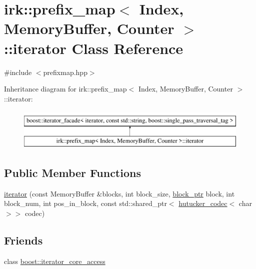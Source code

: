 \hypertarget{classirk_1_1prefix__map_1_1iterator}{}\section{irk\+:\+:prefix\+\_\+map$<$ Index, Memory\+Buffer, Counter $>$\+:\+:iterator Class Reference}
\label{classirk_1_1prefix__map_1_1iterator}


{\ttfamily \#include $<$prefixmap.\+hpp$>$}

Inheritance diagram for irk\+:\+:prefix\+\_\+map$<$ Index, Memory\+Buffer, Counter $>$\+:\+:iterator\+:\begin{figure}[H]
\begin{center}
\leavevmode
\includegraphics[height=2.000000cm]{classirk_1_1prefix__map_1_1iterator}
\end{center}
\end{figure}
\subsection*{Public Member Functions}
\begin{DoxyCompactItemize}
\item 
\mbox{\hyperlink{classirk_1_1prefix__map_1_1iterator_a5701dce183a096eb3c55cfd3d52c803b}{iterator}} (const Memory\+Buffer \&blocks, int block\+\_\+size, \mbox{\hyperlink{classirk_1_1prefix__map_1_1block__ptr}{block\+\_\+ptr}} block, int block\+\_\+num, int pos\+\_\+in\+\_\+block, const std\+::shared\+\_\+ptr$<$ \mbox{\hyperlink{classirk_1_1hutucker__codec}{hutucker\+\_\+codec}}$<$ char $>$$>$ codec)
\end{DoxyCompactItemize}
\subsection*{Friends}
\begin{DoxyCompactItemize}
\item 
class \mbox{\hyperlink{classirk_1_1prefix__map_1_1iterator_ac09f73e325921cc50ebcd96bed0f8096}{boost\+::iterator\+\_\+core\+\_\+access}}
\end{DoxyCompactItemize}


